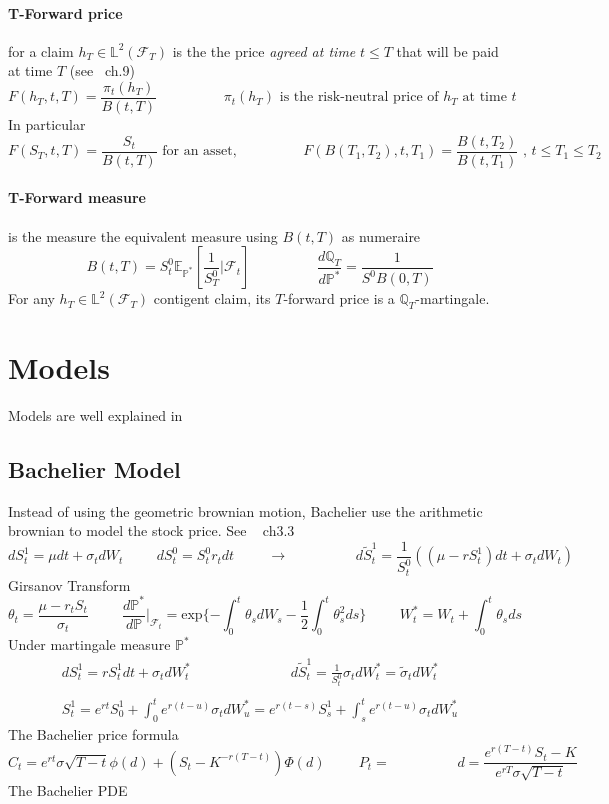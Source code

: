 \documentclass[a4paper,10pt]{article}
\begin{document}
\paragraph{T-Forward price} for a claim $h_T\in \mathbb{L}^2(\mathcal{F}_T)$ is the the price \textit{agreed at time} $t\leq T$ that will be paid at time $T$ (see ~\cite{ELLIOT}ch.9)
\[
F(h_T,t,T) = \frac{\pi_t(h_T)}{B(t,T)}
\hspace{2cm}
\pi_t(h_T) \text{ is the risk-neutral price of } h_T \text{ at time } t
\]
In particular
\[
F(S_T,t,T) = \frac{S_t}{B(t,T)} \text{ for an asset,}
\hspace{2cm}
F(B(T_1,T_2),t,T_1) = \frac{B(t,T_2)}{B(t,T_1)}
\text{ , }
t\leq T_1 \leq T_2
\]
\paragraph{T-Forward measure} is the measure the equivalent measure using $B(t,T)$ as numeraire
\[
B(t,T)=S^0_t \mathbb{E}_{\mathbb{P}^*}[\frac{1}{S^0_T}|\mathcal{F}_t]
\hspace{2cm}
\frac{d\mathbb{Q}_T}{d\mathbb{P}^*} = \frac{1}{S^0 B(0,T)}
\]
For any $h_T\in \mathbb{L}^2(\mathcal{F}_T)$ contigent claim, its $T$-forward price is a $\mathbb{Q}_T$-martingale.

\section{Models}
Models are well explained in ~\cite{MAREK}
\subsection{Bachelier Model}
Instead of using the geometric brownian motion, Bachelier use the arithmetic brownian to model the stock price. See ~\cite{MAREK} ch3.3
\[
dS^1_t = \mu dt + \sigma_t d W_t   \hspace{1cm} dS^0_t =S^0_t r_t dt
\hspace{1cm} \rightarrow \hspace{2cm}
d\widetilde{S}^1_t = \frac{1}{S^0_t}( (\mu - rS^1_t) dt + \sigma_t d W_t )
\]
Girsanov Transform
\[
\theta_t = \frac{\mu - r_t S_t}{\sigma_t} 
\hspace{1cm} 
\frac{d\mathbb{P}^*}{d\mathbb{P}}|_{\mathcal{F}_t} = \text{exp}\{ -\int_0^t \theta_s dW_s - \frac{1}{2} \int_0^t \theta^2_s ds \}
\hspace{1cm} 
W^*_t = W_t + \int_0^t \theta_s ds
\]
Under martingale measure $\mathbb{P}^*$
\[
\begin{array}{l}
dS^1_t = rS^1_t dt + \sigma_t d W^*_t 
\hspace{3cm}
d\widetilde{S}^1_t =  \frac{1}{S^0_t} \sigma_t d W^*_t = \widetilde{\sigma}_t d W^*_t \\ \\
S^1_t = e^{rt}S^1_0 + \int^t_0 e^{r(t-u)} \sigma_t dW^*_u = e^{r(t-s)}S^1_s  + \int^t_s e^{r(t-u)} \sigma_t dW^*_u
\end{array}
\]
The Bachelier price formula
\[
C_t = e^{rt}\sigma\sqrt{T-t}\phi(d) + (S_t - K^{-r(T-t)})\Phi(d)
\hspace{1cm}
P_t=
\hspace{2cm}
d=\frac{ e^{r(T-t)}S_t -K  }{ e^{rT}\sigma\sqrt{T-t} }
\]
The Bachelier PDE
\end{document}

